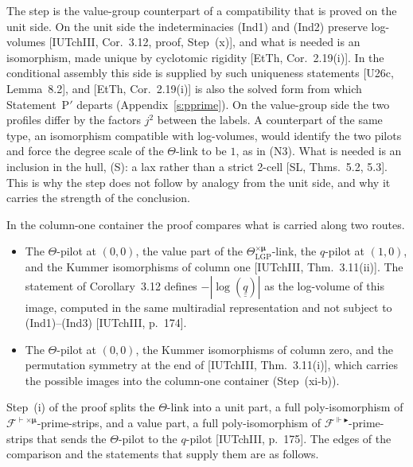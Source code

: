 \documentclass[11pt]{article}
\newcommand{\uu}[1]{\underline{\underline{#1}}}
\theoremstyle{definition}
\begin{document}
The step is the value-group counterpart of a compatibility that is
proved on the unit side.  On the unit side the indeterminacies (Ind1)
and (Ind2) preserve log-volumes [IUTchIII, Cor.~3.12, proof,
Step~(x)], and what is needed is an isomorphism, made unique by
cyclotomic rigidity [EtTh, Cor.~2.19(i)].  In the conditional
assembly this side is supplied by such uniqueness statements
[U26c, Lemma~8.2], and [EtTh, Cor.~2.19(i)] is also the solved form
from which Statement~P$'$ departs (Appendix~\ref{s:pprime}).  On the
value-group side the two profiles differ by the factors $j^2$ between
the labels.  A counterpart of the same type, an isomorphism
compatible with log-volumes, would identify the two pilots and force
the degree scale of the $\Theta$-link to be $1$, as in (N3).  What is
needed is an inclusion in the hull, (S): a lax rather than a strict
2-cell [SL, Thms.~5.2, 5.3].  This is why the step does not follow by
analogy from the unit side, and why it carries the strength of the
conclusion.

In the column-one container the proof compares what is carried along
two routes.
\begin{itemize}[leftmargin=4.8em,labelwidth=4.2em,labelsep=0.6em,align=left]
\item[Route 1] The $\Theta$-pilot at $(0,0)$, the value part of the
$\Theta^{\times\boldsymbol\mu}_{\mathrm{LGP}}$-link, the $q$-pilot at
$(1,0)$, and the Kummer isomorphisms of column one
[IUTchIII, Thm.~3.11(ii)].  The statement of Corollary~3.12 defines
$-|\log(\uu q)|$ as the log-volume of this image, computed in the
same multiradial representation and not subject to (Ind1)--(Ind3)
[IUTchIII, p.~174].
\item[Route 2] The $\Theta$-pilot at $(0,0)$, the Kummer isomorphisms
of column zero, and the permutation symmetry at the end of
[IUTchIII, Thm.~3.11(i)], which carries the possible images into the
column-one container (Step~(xi-b)).
\end{itemize}
Step~(i) of the proof splits the $\Theta$-link into a unit part, a
full poly-isomorphism of $\mathcal F^{\vdash\times\boldsymbol\mu}$-prime-strips,
and a value part, a full poly-isomorphism of
$\mathcal F^{\Vdash\blacktriangleright}$-prime-strips that sends the
$\Theta$-pilot to the $q$-pilot [IUTchIII, p.~175].  The edges of the
comparison and the statements that supply them are as follows.
\end{document}
